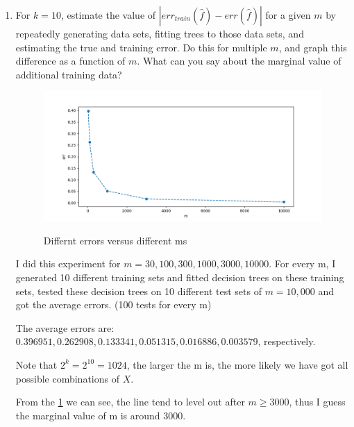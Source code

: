 \documentclass[letter, 12pt]{article}
\begin{document}
\begin{enumerate}
\begin{verbatim}
def get_err(tree, X, Y):
    s = 0
    m, k = X.shape
    for i in range(m):
        prediction = predict(tree.root, X[i])
        if prediction != Y[i]:
            s += 1
    print('Training error is: %f' % (1.0 * s / m))
    return 1.0 * s / m
        \end{verbatim}
        \par{I generated data of $ m = 10,000 $ and used the decision tree I got in the previous question to predict $ Y $ and get the error. I did this for $ 50 $ times and then got the average error: $ 0.046790 $.}
        
        \item {For $ k = 10 $, estimate the value of $ |err_{train} (\hat{f}) - err (\hat{f})| $ for a given $ m $ by repeatedly generating data sets, fitting
            trees to those data sets, and estimating the true and training error. Do this for multiple $ m $, and graph this
            difference as a function of $ m $. What can you say about the marginal value of additional training data?}
        \begin{figure}[H]
        	\centering
        	\includegraphics[width=\textwidth]{q5.png}
        	\label{fig:q5}
        	\caption{Differnt errors versus different ms}
        \end{figure}
    	\par{I did this experiment for $ m = 30, 100, 300, 1000, 3000, 10000 $. For every m, I generated 10 different training sets and fitted decision trees on these training sets, tested these decision trees on 10 different test sets of $ m = 10,000 $ and got the average errors. (100 tests for every m)}
    	\par{The average errors are: $ 0.396951, 0.262908, 0.133341, 0.051315, 0.016886, 0.003579 $, respectively.}
    	\par{Note that $ 2^k = 2^{10} = 1024 $, the larger the m is, the more likely we have got all possible combinations of $ X $.}
    	\par{From the \ref{fig:q5} we can see, the line tend to level out after $ m \ge 3000 $, thus I guess the marginal value of m is around $ 3000 $.}
    	

\end{enumerate}
\end{document}
